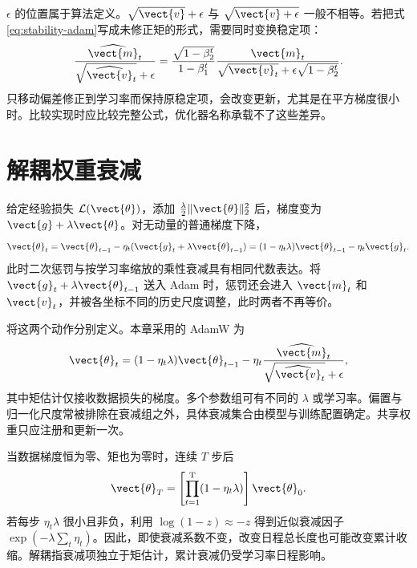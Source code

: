 \documentclass[../textbook.tex]{subfiles}
\begin{document}
$\epsilon$ 的位置属于算法定义。$\sqrt{\vect{v}}+\epsilon$ 与 $\sqrt{\vect{v}+\epsilon}$ 一般不相等。若把式\eqref{eq:stability-adam}写成未修正矩的形式，需要同时变换稳定项：
\begin{equation}
 \frac{\widehat{\vect{m}}_t}{\sqrt{\widehat{\vect{v}}_t}+\epsilon}
 =\frac{\sqrt{1-\beta_2^t}}{1-\beta_1^t}
 \frac{\vect{m}_t}{\sqrt{\vect{v}_t}+\epsilon\sqrt{1-\beta_2^t}}.
\end{equation}
只移动偏差修正到学习率而保持原稳定项，会改变更新，尤其是在平方梯度很小时。比较实现时应比较完整公式，优化器名称承载不了这些差异。

\section{解耦权重衰减}

给定经验损失 $\mathcal L(\vect{\theta})$，添加 $\frac\lambda2\|\vect{\theta}\|_2^2$ 后，梯度变为 $\vect{g}+\lambda\vect{\theta}$。对无动量的普通梯度下降，
\begin{equation}
 \vect{\theta}_t=\vect{\theta}_{t-1}-\eta_t(\vect{g}_t+\lambda\vect{\theta}_{t-1})
 =(1-\eta_t\lambda)\vect{\theta}_{t-1}-\eta_t\vect{g}_t.
\end{equation}
此时二次惩罚与按学习率缩放的乘性衰减具有相同代数表达。将 $\vect{g}_t+\lambda\vect{\theta}_{t-1}$ 送入 Adam 时，惩罚还会进入 $\vect{m}_t$ 和 $\vect{v}_t$，并被各坐标不同的历史尺度调整，此时两者不再等价。

将这两个动作分别定义\autocite{loshchilov2019adamw}。本章采用的 AdamW 为
\begin{equation}
 \vect{\theta}_t=(1-\eta_t\lambda)\vect{\theta}_{t-1}
 -\eta_t\frac{\widehat{\vect{m}}_t}{\sqrt{\widehat{\vect{v}}_t}+\epsilon},
 \label{eq:stability-adamw}
\end{equation}
其中矩估计仅接收数据损失的梯度。多个参数组可有不同的 $\lambda$ 或学习率。偏置与归一化尺度常被排除在衰减组之外，具体衰减集合由模型与训练配置确定。共享权重只应注册和更新一次。


当数据梯度恒为零、矩也为零时，连续 $T$ 步后
\begin{equation}
 \vect{\theta}_T=\left[\prod_{t=1}^{\mathrm{T}}(1-\eta_t\lambda)\right]\vect{\theta}_0.
\end{equation}
若每步 $\eta_t\lambda$ 很小且非负，利用 $\log(1-z)\approx-z$ 得到近似衰减因子 $\exp(-\lambda\sum_t\eta_t)$。因此，即使衰减系数不变，改变日程总长度也可能改变累计收缩。解耦指衰减项独立于矩估计，累计衰减仍受学习率日程影响。
\end{document}
